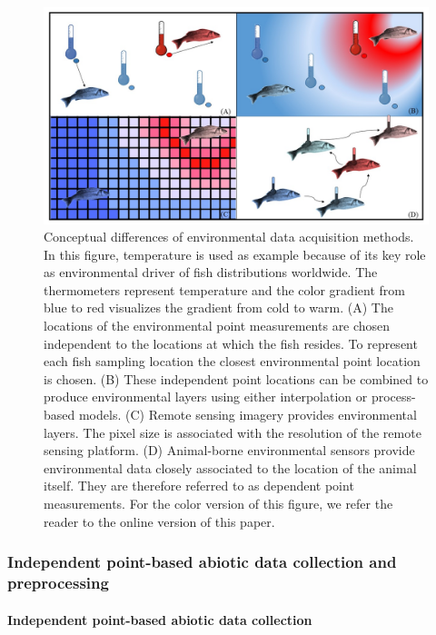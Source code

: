\documentclass[12pt,authoryear]{elsarticle}
\begin{document}
\begin{figure}[!ht]
  \centering
	\includegraphics[scale=0.45]{Figure2}
  \caption{Conceptual differences of environmental data acquisition methods. In this figure, temperature is used as example because of its key role as environmental driver of fish distributions worldwide. The thermometers represent temperature and the color gradient from blue to red visualizes the gradient from cold to warm. (A) The locations of the environmental point measurements are chosen independent to the locations at which the fish resides. To represent each fish sampling location the closest environmental point location is chosen. (B) These independent point locations can be combined to produce environmental layers using either interpolation or process-based models. (C) Remote sensing imagery provides environmental layers. The pixel size is associated with the resolution of the remote sensing platform. (D) Animal-borne environmental sensors provide environmental data closely associated to the location of the animal itself. They are therefore referred to as dependent point measurements. For the color version of this figure, we refer the reader to the online version of this paper.}
  \label{fig:Figure2}
\end{figure}

\subsubsection{Independent point-based abiotic data collection and preprocessing}
\label{Indep:Point}

\paragraph{Independent point-based abiotic data collection}\mbox{}\\
\end{document}
